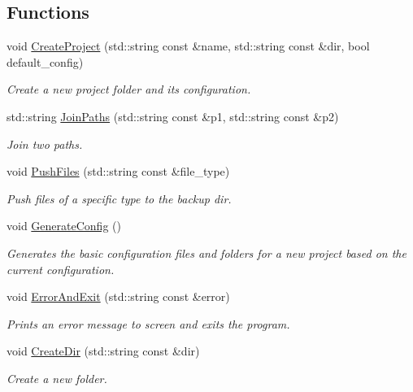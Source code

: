 \subsection*{Functions}
\begin{DoxyCompactItemize}
\item 
void \mbox{\hyperlink{namespacemlm_a99c5ec9aacfca3760d92e760abfd82aa}{Create\+Project}} (std\+::string const \&name, std\+::string const \&dir, bool default\+\_\+config)
\begin{DoxyCompactList}\small\item\em Create a new project folder and its configuration. \end{DoxyCompactList}\item 
std\+::string \mbox{\hyperlink{namespacemlm_a9da3943732b60181527a87eb67fe5cae}{Join\+Paths}} (std\+::string const \&p1, std\+::string const \&p2)
\begin{DoxyCompactList}\small\item\em Join two paths. \end{DoxyCompactList}\item 
void \mbox{\hyperlink{namespacemlm_a68835e331da902afbc67f55a3036ce2d}{Push\+Files}} (std\+::string const \&file\+\_\+type)
\begin{DoxyCompactList}\small\item\em Push files of a specific type to the backup dir. \end{DoxyCompactList}\item 
\mbox{\label{namespacemlm_ac227248c6dad6c2c46f5d72e42140d69}} 
void \mbox{\hyperlink{namespacemlm_ac227248c6dad6c2c46f5d72e42140d69}{Generate\+Config}} ()
\begin{DoxyCompactList}\small\item\em Generates the basic configuration files and folders for a new project based on the current configuration. \end{DoxyCompactList}\item 
void \mbox{\hyperlink{namespacemlm_ac4e5fd55f7a10778ef7b1d3cdc321331}{Error\+And\+Exit}} (std\+::string const \&error)
\begin{DoxyCompactList}\small\item\em Prints an error message to screen and exits the program. \end{DoxyCompactList}\item 
void \mbox{\hyperlink{namespacemlm_abc6c7b9c91666df4db2bbe66bcc8520f}{Create\+Dir}} (std\+::string const \&dir)
\begin{DoxyCompactList}\small\item\em Create a new folder. \end{DoxyCompactList}\item 

\end{DoxyCompactItemize}
